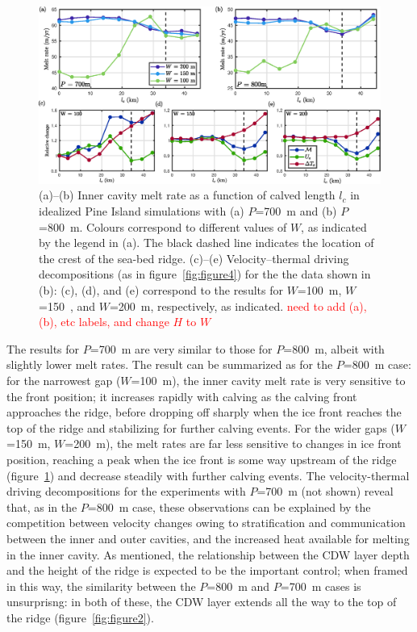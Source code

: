 \documentclass[draft]{agujournal2019}
\newcommand{\red}[1]{\textcolor{red}{#1}}
\begin{document}
\begin{figure}
    \centering
    \includegraphics[width = \textwidth]{../make_figures/plots/figure8.eps}
    \caption{(a)--(b) Inner cavity melt rate as a function of calved length $l_c$ in idealized Pine Island simulations with (a) $P$=700~m and (b) $P$=800~m. Colours correspond to different values of $W$, as indicated by the legend in (a). The black dashed line indicates the location of the crest of the sea-bed ridge. (c)--(e) Velocity--thermal driving decompositions (as in figure~\ref{fig:figure4}) for the the data shown in (b): (c), (d), and (e) correspond to the results for $W$=100~m, $W$=150~, and $W$=200~m, respectively, as indicated. \red{need to add (a), (b), etc labels, and change $H$ to $W$}  }
    \label{fig:figure8}
\end{figure}

The results for $P$=700~m are very similar to those for $P$=800~m, albeit with slightly lower melt rates. The result can be summarized as for the $P$=800~m case: for the narrowest gap ($W$=100~m), the inner cavity melt rate is very sensitive to the front position; it increases rapidly with calving as the calving front approaches the ridge, before dropping off sharply when the ice front reaches the top of the ridge and stabilizing for further calving events. For the wider gaps ($W$=150~m, $W$=200~m), the melt rates are far less sensitive to changes in ice front position, reaching a peak when the ice front is some way upstream of the ridge (figure~\ref{fig:figure8}) and decrease steadily with further calving events. The velocity-thermal driving decompositions for the experiments with $P$=700~m (not shown) reveal that, as in the $P$=800~m case, these observations can be explained by the competition between velocity changes owing to stratification and communication between the inner and outer cavities, and the increased heat available for melting in the inner cavity. As mentioned, the relationship between the CDW layer depth and the height of the ridge is expected to be the important control; when framed in this way, the similarity between the $P$=800~m and $P$=700~m cases is unsurprisng: in both of these, the CDW layer extends all the way to the top of the ridge (figure~\ref{fig:figure2}).
\end{document}
